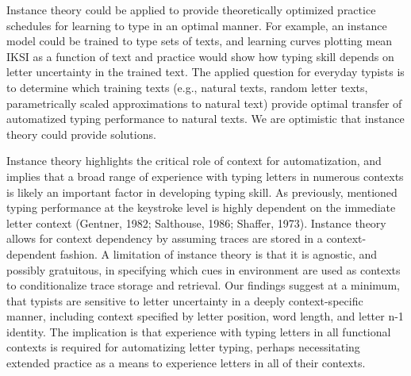 \documentclass[,man,floatsintext]{apa6}
\begin{document}
Instance theory could be applied to provide theoretically optimized practice schedules for learning to type in an optimal manner. For example, an instance model could be trained to type sets of texts, and learning curves plotting mean IKSI as a function of text and practice would show how typing skill depends on letter uncertainty in the trained text. The applied question for everyday typists is to determine which training texts (e.g., natural texts, random letter texts, parametrically scaled approximations to natural text) provide optimal transfer of automatized typing performance to natural texts. We are optimistic that instance theory could provide solutions.

Instance theory highlights the critical role of context for automatization, and implies that a broad range of experience with typing letters in numerous contexts is likely an important factor in developing typing skill. As previously, mentioned typing performance at the keystroke level is highly dependent on the immediate letter context (Gentner, 1982; Salthouse, 1986; Shaffer, 1973). Instance theory allows for context dependency by assuming traces are stored in a context-dependent fashion. A limitation of instance theory is that it is agnostic, and possibly gratuitous, in specifying which cues in environment are used as contexts to conditionalize trace storage and retrieval. Our findings suggest at a minimum, that typists are sensitive to letter uncertainty in a deeply context-specific manner, including context specified by letter position, word length, and letter n-1 identity. The implication is that experience with typing letters in all functional contexts is required for automatizing letter typing, perhaps necessitating extended practice as a means to experience letters in all of their contexts.
\end{document}
